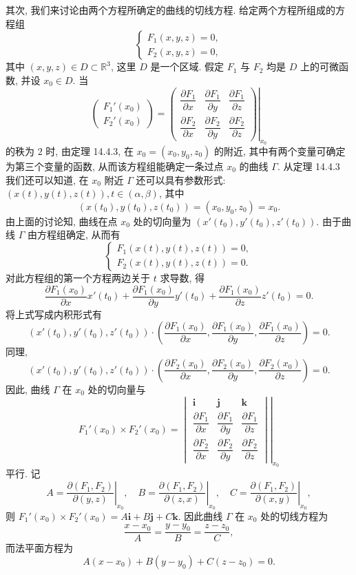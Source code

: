 \documentclass[UTF8, 12pt, fontset=fandol, oneside]{ctexart}
\begin{document}
其次, 我们来讨论由两个方程所确定的曲线的切线方程. 给定两个方程所组成的方程组
\[
  \begin{cases}
    F_1(x,y,z)=0,\\
    F_2(x,y,z)=0,
  \end{cases}
\]
其中 $(x,y,z)\in D\subset\mathbb R^3$, 这里 $D$ 是一个区域. 假定 $F_1$ 与 $F_2$ 均是 $D$ 上的可微函数, 并设 $x_0\in D$. 当
\[
  \begin{pmatrix}
    F_1'(x_0)\\
    F_2'(x_0)
  \end{pmatrix}
  =
  \left.
  \begin{pmatrix}
    \dfrac{\partial F_1}{\partial x} & \dfrac{\partial F_1}{\partial y} & \dfrac{\partial F_1}{\partial z}\\
    \dfrac{\partial F_2}{\partial x} & \dfrac{\partial F_2}{\partial y} & \dfrac{\partial F_2}{\partial z}
  \end{pmatrix}
  \right|_{x_0}
\]
的秩为 $2$ 时, 由定理 14.4.3, 在 $x_0=(x_0,y_0,z_0)$ 的附近, 其中有两个变量可确定为第三个变量的函数, 从而该方程组能确定一条过点 $x_0$ 的曲线 $\Gamma$. 从定理 14.4.3 我们还可以知道, 在 $x_0$ 附近 $\Gamma$ 还可以具有参数形式: $(x(t),y(t),z(t)),t\in(\alpha,\beta)$, 其中
\[
  (x(t_0),y(t_0),z(t_0))=(x_0,y_0,z_0)=x_0.
\]
由上面的讨论知, 曲线在点 $x_0$ 处的切向量为 $(x'(t_0),y'(t_0),z'(t_0))$. 由于曲线 $\Gamma$ 由方程组确定, 从而有
\[
  \begin{cases}
    F_1(x(t),y(t),z(t))=0,\\
    F_2(x(t),y(t),z(t))=0.
  \end{cases}
\]
对此方程组的第一个方程两边关于 $t$ 求导数, 得
\[
  \frac{\partial F_1(x_0)}{\partial x}x'(t_0)
  +
  \frac{\partial F_1(x_0)}{\partial y}y'(t_0)
  +
  \frac{\partial F_1(x_0)}{\partial z}z'(t_0)
  =0.
\]
将上式写成内积形式有
\[
  (x'(t_0),y'(t_0),z'(t_0))\cdot
  \left(
    \frac{\partial F_1(x_0)}{\partial x},
    \frac{\partial F_1(x_0)}{\partial y},
    \frac{\partial F_1(x_0)}{\partial z}
  \right)
  =0.
\]
同理,
\[
  (x'(t_0),y'(t_0),z'(t_0))\cdot
  \left(
    \frac{\partial F_2(x_0)}{\partial x},
    \frac{\partial F_2(x_0)}{\partial y},
    \frac{\partial F_2(x_0)}{\partial z}
  \right)
  =0.
\]
因此, 曲线 $\Gamma$ 在 $x_0$ 处的切向量与
\[
  F_1'(x_0)\times F_2'(x_0)
  =
  \left.
  \begin{vmatrix}
    \mathbf i & \mathbf j & \mathbf k\\
    \dfrac{\partial F_1}{\partial x} & \dfrac{\partial F_1}{\partial y} & \dfrac{\partial F_1}{\partial z}\\
    \dfrac{\partial F_2}{\partial x} & \dfrac{\partial F_2}{\partial y} & \dfrac{\partial F_2}{\partial z}
  \end{vmatrix}
  \right|_{x_0}
\]
平行. 记
\[
  A=\left.\frac{\partial(F_1,F_2)}{\partial(y,z)}\right|_{x_0},\quad
  B=\left.\frac{\partial(F_1,F_2)}{\partial(z,x)}\right|_{x_0},\quad
  C=\left.\frac{\partial(F_1,F_2)}{\partial(x,y)}\right|_{x_0},
\]
则 $F_1'(x_0)\times F_2'(x_0)=A\mathbf i+B\mathbf j+C\mathbf k$. 因此曲线 $\Gamma$ 在 $x_0$ 处的切线方程为
\[
  \frac{x-x_0}{A}=\frac{y-y_0}{B}=\frac{z-z_0}{C},
\]
而法平面方程为
\[
  A(x-x_0)+B(y-y_0)+C(z-z_0)=0.
\]
\end{document}
